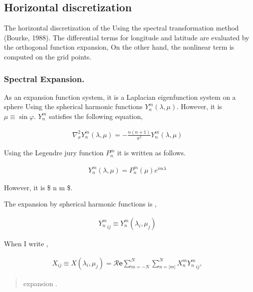 \hypertarget{horizontal-discretization}{%
\subsection{Horizontal discretization}\label{horizontal-discretization}}

The horizontal discretization of the Using the spectral transformation
method (Bourke, 1988). The differential terms for longitude and latitude
are evaluated by the orthogonal function expansion, On the other hand,
the nonlinear term is computed on the grid points.

\hypertarget{spectral-expansion.}{%
\subsubsection{Spectral Expansion.}\label{spectral-expansion.}}

As an expansion function system, it is a Laplacian eigenfunction system
on a sphere Using the spherical harmonic functions
\(Y_n^m(\lambda,\mu)\). However, it is \(\mu \equiv \sin\varphi\).
\(Y_n^m\) satisfies the following equation,

\begin{eqnarray}
\nabla^{2}_{\sigma} Y_n^m(\lambda,\mu)
= - \frac{n(n+1)}{a^{2}} Y_n^m(\lambda,\mu)
\end{eqnarray}

Using the Legendre jury function \(P_n^m\) it is written as follows.

\begin{eqnarray}
Y_n^m(\lambda,\mu) = P_n^m (\mu) e^{im \lambda}
\end{eqnarray}

However, it is \$ n \geq \textbar{} m \textbar{} \$.

The expansion by spherical harmonic functions is ,

\begin{eqnarray}
   {Y_n^m}_{ij} \equiv Y_n^m ( \lambda_i, \mu_j )
\end{eqnarray}

When I write ,

\begin{eqnarray}
  X_{ij} \equiv X ( \lambda_i, \mu_j )
  =  {\mathcal R}\mathbf{e} \sum_{m=-N}^{N} \sum_{n=|m|}^{N}
        X_n^m {Y_n^m}_{ij} ,
\end{eqnarray}

\begin{quote}
\protect\hypertarget{sphericalux20expansion}{}{\centric expansion }.
\end{quote}

